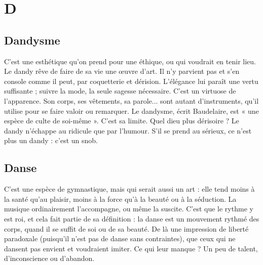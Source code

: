 
\chapter{D}

\section{Dandysme}
C’est une esthétique qu’on prend pour une éthique, ou qui
voudrait en tenir lieu. Le dandy rêve de faire de sa vie une
œuvre d'art. Il n’y parvient pas et s’en console comme il peut, par coquetterie
et dérision. L’élégance lui paraît une vertu suffisante ; suivre la mode, la seule
sagesse nécessaire. C’est un virtuose de l’apparence. Son corps, ses vêtements, sa
parole... sont autant d’instruments, qu’il utilise pour se faire valoir ou remarquer.
Le dandysme, écrit Baudelaire, est « une espèce de culte de soi-même ».
C’est sa limite. Quel dieu plus dérisoire ? Le dandy n’échappe au ridicule que
par l'humour. S’il se prend au sérieux, ce n’est plus un dandy : c’est un snob.

\section{Danse}
C’est une espèce de gymnastique, mais qui serait aussi un art : elle
tend moins à la santé qu’au plaisir, moins à la force qu’à la beauté
ou à la séduction. La musique ordinairement l’accompagne, ou même la suscite.
C’est que le rythme y est roi, et cela fait partie de sa définition : la danse
est un mouvement rythmé des corps, quand il se suffit de soi ou de sa beauté.
De là une impression de liberté paradoxale (puisqu'il n’est pas de danse sans
contraintes), que ceux qui ne dansent pas envient et voudraient imiter. Ce qui
leur manque ? Un peu de talent, d’inconscience ou d’abandon.

